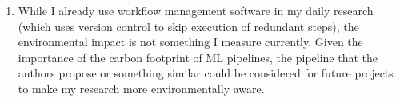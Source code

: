 \documentclass[11pt]{article}
\begin{document}
\begin{enumerate}
    \item While I already use workflow management software in my daily research (which uses version control to skip execution of redundant steps), the environmental impact is not something I measure currently. Given the importance of the carbon footprint of ML pipelines, the pipeline that the authors propose or something similar could be considered for future projects to make my research more environmentally aware.
    
\end{enumerate}

\begin{comment}

notes:
\begin{itemize}
    \item recent developments in AI and ML are revolutionising lots of fields, but also eating up lots of resources due to training requiring lots of energy in large data centers (particularly deep learning). gotta find ways to mitigate the environmental impact due to climate change being an important issue worldwide
    \item made a ml pipeline (CEMAI) that monitors carbon emissions of an ml model throughout the development process? from data loading to training to something. can then monitor carbon emissions to optimise performance and environmental impact
    \item need lifecycle analysis when developing ml tools, and incorporating environmental impact as another objective alongside predictive performance
    \item tools exist, but they do not all take into consideration everything that comes before and after training, the specific hardware that is being used, or the specific real-world setting where the model is being employed
    \item CEMAI -> a ml pipeline with such carbon emission tracking tools incorporated into each subtask of the pipeline like data processing, training, prediction. version control for data saves energy by enabling step skipping
    \item three case studies -> find worst steps for carbon em + evaluate impact of hardware
    \item main contributions: the pipeline (novel), the case studies (empirical), the thinking (environment)
    \item important for AI going forward: track environmental impact during both development and deployment using green AI metrics like energy use, carbon emission etc. use CodeCarbon during the whole pipeline to track (or rather, estimate) a number of metrics related to environmental impact.
    \item steps of a pipeline:
    \begin{enumerate}
        \item data preprocessing
        \item training
        \item performance evaluation
    \end{enumerate}
    \item 
\end{itemize}


\end{comment}
\end{document}
